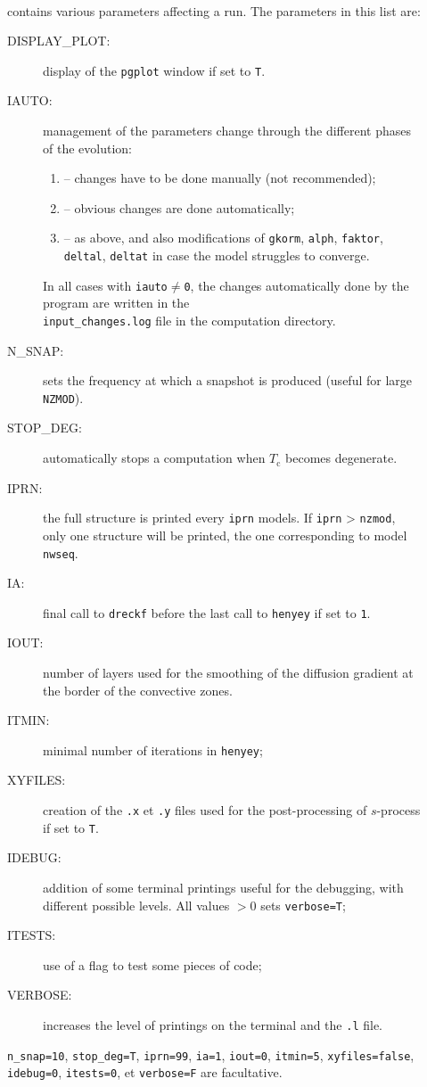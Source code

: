 \documentclass[11pt]{article}
\begin{document}
\begin{description}
  \item[] ~\\ contains various parameters affecting a run. The parameters in this list are:
    \begin{description}
      \item[DISPLAY\_PLOT:] display of the \texttt{pgplot} window if set to \texttt{T}.
      \item[IAUTO:] management of the parameters change through the different phases of the evolution:
        \begin{enumerate}[labelindent=.5cm,font=\ttfamily \bfseries,label=\arabic*:]
          \item[0] -- changes have to be done manually (not recommended);
          \item[1] -- obvious changes are done automatically;
          \item[2] -- as above, and also modifications of {\tt gkorm}, {\tt alph}, {\tt faktor}, {\tt deltal}, {\tt deltat}  in case the model struggles to converge.
        \end{enumerate}
      In all cases with {\tt iauto$\ne$0}, the changes automatically done by the program are written in the\\ {\tt input\_changes.log} file in the computation directory.
      \item[N\_SNAP:] sets the frequency at which a snapshot is produced (useful for large \texttt{NZMOD}).
      \item[STOP\_DEG:] automatically stops a computation when $T_\text{c}$ becomes degenerate.
      \item[IPRN:] the full structure is printed every {\tt iprn} models. If \texttt{iprn} > \texttt{nzmod}, only one structure will be printed, the one corresponding to model \texttt{nwseq}.
      \item[IA:] final call to \texttt{dreckf} before the last call to \texttt{henyey} if set to {\tt 1}.
      \item[IOUT:] number of layers used for the smoothing of the diffusion gradient at the border of the  convective zones.
      \item[ITMIN:] minimal number of iterations in \texttt{henyey};
      \item[XYFILES:] creation of the \texttt{.x} et \texttt{.y} files used for the post-processing of $s$-process if set to \texttt{T}.
      \item[IDEBUG:] addition of some terminal printings useful for the debugging, with different possible levels. All values $> 0$ sets \texttt{verbose=T};
      \item[ITESTS:] use of a flag to test some pieces of code;
      \item[VERBOSE:] increases the level of printings on the terminal and the \texttt{.l} file.
    \end{description}
    \texttt{n\_snap=10}, \texttt{stop\_deg=T}, \texttt{iprn=99}, \texttt{ia=1}, \texttt{iout=0}, \texttt{itmin=5}, \texttt{xyfiles=false}, \texttt{idebug=0}, \texttt{itests=0}, et \texttt{verbose=F} are facultative.\\
  \end{description}
\end{document}
